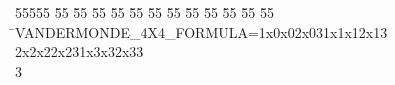%
%
\begin{tabbing}
55555 \= 55 \= 55 \= 55 \= 55 \= 55 \= 55 \= 55 \= 55 \= 55 \= 55 \= 55 \= 55 \= \>VANDERMONDE\_4X4\_FORMULA=1x0x02x031x1x12x13\\[0pt]
2x2x22x231x3x32x33\\[0pt]
3\>\end{tabbing}
